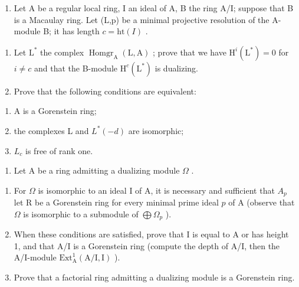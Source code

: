 \begin{enumerate}
\def\labelenumi{\arabic{enumi})}
\setcounter{enumi}{1}
\tightlist
\item
  Let A be a regular local ring, I an ideal of A, B the ring A/I; suppose that B is a Macaulay ring. Let (L,p) be a minimal projective resolution of the A-module B; it has length \(c = \text{ht}(I)\) .
\end{enumerate}

\begin{enumerate}
\def\labelenumi{\alph{enumi})}
\item
  Let \(\mathrm{L}^*\) the complex \(\operatorname{Homgr}_{\mathrm{A}}(\mathrm{L},\mathrm{A})\) ; prove that we have \(\mathrm{H}^{i}(\mathrm{L}^{*}) = 0\) for \(i\neq c\) and that the B-module \(\mathrm{H}^c (\mathrm{L}^*)\) is dualizing.
\item
  Prove that the following conditions are equivalent:
\end{enumerate}

\begin{enumerate}
\def\labelenumi{(\roman{enumi})}
\item
  A is a Gorenstein ring;
\item
  the complexes L and \(L^{*}(-d)\) are isomorphic;
\item
  \(L_{c}\) is free of rank one.
\end{enumerate}

\begin{enumerate}
\def\labelenumi{\arabic{enumi})}
\setcounter{enumi}{2}
\tightlist
\item
  Let A be a ring admitting a dualizing module \(\Omega\) .
\end{enumerate}

\begin{enumerate}
\def\labelenumi{\alph{enumi})}
\item
  For \(\Omega\) is isomorphic to an ideal I of A, it is necessary and sufficient that \(A_{p}\) let R be a Gorenstein ring for every minimal prime ideal \(p\) of A (observe that \(\Omega\) is isomorphic to a submodule of \(\bigoplus \Omega_{p}\) ).
\item
  When these conditions are satisfied, prove that I is equal to A or has height 1, and that A/I is a Gorenstein ring (compute the depth of A/I, then the A/I-module \(\mathrm{Ext}_{\mathrm{A}}^{1}(\mathrm{A / I,I})\) ).
\item
  Prove that a factorial ring admitting a dualizing module is a Gorenstein ring.
\end{enumerate}

